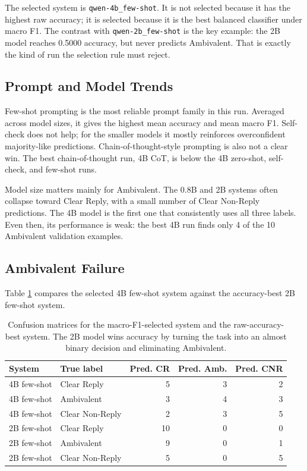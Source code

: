 \documentclass[12pt]{fphw}
\newcommand{\CR}{Clear Reply}
\newcommand{\AMB}{Ambivalent}
\newcommand{\CNR}{Clear Non-Reply}
\begin{document}
The selected system is \texttt{qwen-4b\_few-shot}. It is not selected because it has the highest raw accuracy; it is selected because it is the best balanced classifier under macro F1. The contrast with \texttt{qwen-2b\_few-shot} is the key example: the 2B model reaches 0.5000 accuracy, but never predicts \AMB. That is exactly the kind of run the selection rule must reject.

\subsection{Prompt and Model Trends}

Few-shot prompting is the most reliable prompt family in this run. Averaged across model sizes, it gives the highest mean accuracy and mean macro F1. Self-check does not help; for the smaller models it mostly reinforces overconfident majority-like predictions. Chain-of-thought-style prompting is also not a clear win. The best chain-of-thought run, 4B CoT, is below the 4B zero-shot, self-check, and few-shot runs.

Model size matters mainly for \AMB. The 0.8B and 2B systems often collapse toward \CR, with a small number of \CNR{} predictions. The 4B model is the first one that consistently uses all three labels. Even then, its performance is weak: the best 4B run finds only 4 of the 10 \AMB{} validation examples.

\subsection{Ambivalent Failure}

Table \ref{tab:confusions} compares the selected 4B few-shot system against the accuracy-best 2B few-shot system.

\begin{table}[h]
\centering
\begin{tabular}{llrrr}
\toprule
System & True label & Pred. CR & Pred. Amb. & Pred. CNR \\
\midrule
4B few-shot & \CR & 5 & 3 & 2 \\
4B few-shot & \AMB & 3 & 4 & 3 \\
4B few-shot & \CNR & 2 & 3 & 5 \\
\midrule
2B few-shot & \CR & 10 & 0 & 0 \\
2B few-shot & \AMB & 9 & 0 & 1 \\
2B few-shot & \CNR & 5 & 0 & 5 \\
\bottomrule
\end{tabular}
\caption{Confusion matrices for the macro-F1-selected system and the raw-accuracy-best system. The 2B model wins accuracy by turning the task into an almost binary decision and eliminating \AMB.}
\label{tab:confusions}
\end{table}
\end{document}
